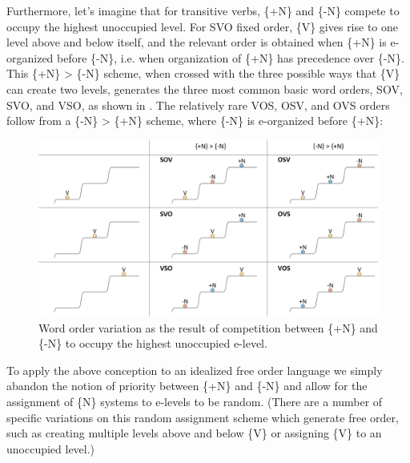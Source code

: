   Furthermore, let's imagine that for transitive verbs, \{+N\} and \{-N\} compete to occupy the highest unoccupied level. For SVO fixed order, \{V\} gives rise to one level above and below itself, and the relevant order is obtained when \{+N\} is e-organized before \{-N\}, i.e. when organization of \{+N\} has precedence over \{-N\}. This \{+N\} > \{-N\} scheme, when crossed with the three possible ways that \{V\} can create two levels, generates the three most common basic word orders, SOV, SVO, and VSO, as shown in {}. The relatively rare VOS, OSV, and OVS orders follow from a \{-N\} > \{+N\} scheme, where \{-N\} is e-organized before \{+N\}:

  
\begin{figure}
\includegraphics[width=\textwidth]{figures/Tilsen-img75.png}
\caption{Word order variation as the result of competition between \{+N\} and \{-N\} to occupy the highest unoccupied e-level.}
\label{fig:4:25}
\end{figure}
 

  To apply the above conception to an idealized free order language we simply abandon the notion of priority between \{+N\} and \{-N\} and allow for the assignment of \{N\} systems to e-levels to be random. (There are a number of specific variations on this random assignment scheme which generate free order, such as creating multiple levels above and below \{V\} or assigning \{V\} to an unoccupied level.)

